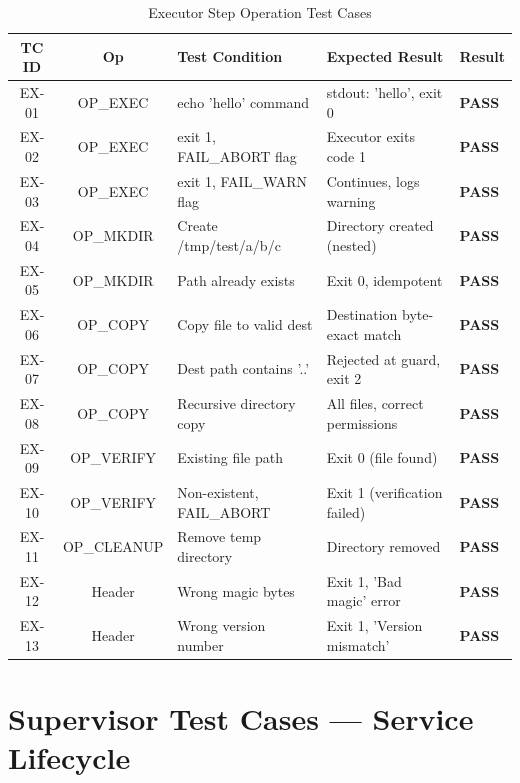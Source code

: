 \documentclass[12pt,a4paper]{report}
\begin{document}
\begin{table}[H]
\centering
\caption{Executor Step Operation Test Cases}
\renewcommand{\arraystretch}{1.2}
\begin{tabularx}{\linewidth}{c c X X >{\centering\arraybackslash}p{1.2cm}}
\toprule
\textbf{TC ID} & \textbf{Op} & \textbf{Test Condition} & \textbf{Expected Result} & \textbf{Result}\\
\midrule
EX-01 & OP\_EXEC    & echo 'hello' command         & stdout: 'hello', exit 0          & \textbf{PASS}\\
EX-02 & OP\_EXEC    & exit 1, FAIL\_ABORT flag     & Executor exits code 1            & \textbf{PASS}\\
EX-03 & OP\_EXEC    & exit 1, FAIL\_WARN flag      & Continues, logs warning          & \textbf{PASS}\\
EX-04 & OP\_MKDIR   & Create /tmp/test/a/b/c       & Directory created (nested)       & \textbf{PASS}\\
EX-05 & OP\_MKDIR   & Path already exists           & Exit 0, idempotent               & \textbf{PASS}\\
EX-06 & OP\_COPY    & Copy file to valid dest       & Destination byte-exact match     & \textbf{PASS}\\
EX-07 & OP\_COPY    & Dest path contains '..'       & Rejected at guard, exit 2        & \textbf{PASS}\\
EX-08 & OP\_COPY    & Recursive directory copy      & All files, correct permissions   & \textbf{PASS}\\
EX-09 & OP\_VERIFY  & Existing file path            & Exit 0 (file found)              & \textbf{PASS}\\
EX-10 & OP\_VERIFY  & Non-existent, FAIL\_ABORT     & Exit 1 (verification failed)     & \textbf{PASS}\\
EX-11 & OP\_CLEANUP & Remove temp directory         & Directory removed                & \textbf{PASS}\\
EX-12 & Header      & Wrong magic bytes             & Exit 1, 'Bad magic' error        & \textbf{PASS}\\
EX-13 & Header      & Wrong version number          & Exit 1, 'Version mismatch'       & \textbf{PASS}\\
\bottomrule
\end{tabularx}
\end{table}

\FloatBarrier
\section{Supervisor Test Cases --- Service Lifecycle}
\end{document}
